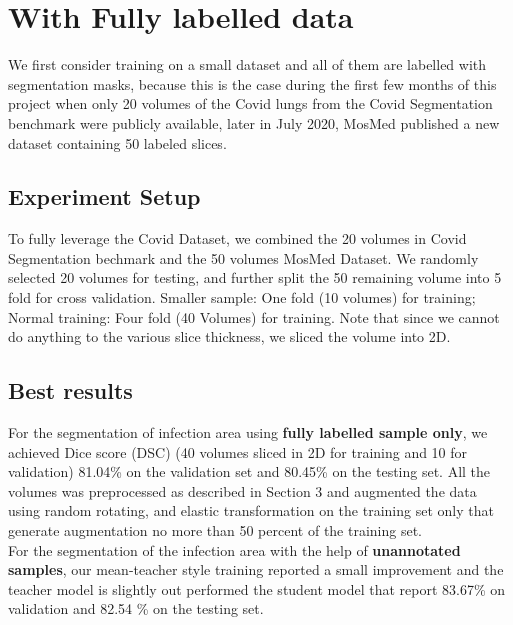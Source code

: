 \section{With Fully labelled data}
We first consider training on a small dataset and all of them are labelled with segmentation masks, because this is the case during the first few months of this project when only 20 volumes of the Covid lungs from the Covid Segmentation benchmark were publicly available, later in July 2020, MosMed published a new dataset containing 50 labeled slices.

\subsection{Experiment Setup}
To fully leverage the Covid Dataset, we combined the 20 volumes in Covid Segmentation bechmark and the 50 volumes MosMed Dataset. We randomly selected 20 volumes for testing, and further split the 50 remaining volume into 5 fold for cross validation. Smaller sample: One fold (10 volumes) for training; Normal training: Four fold (40 Volumes) for training.
Note that since we cannot do anything to the various slice thickness, we sliced the volume into 2D.

\subsection{Best results}
For the segmentation of infection area using \textbf{fully labelled sample only}, we achieved Dice score (DSC) (40 volumes sliced in 2D for training and 10 for validation) 81.04\% on the validation set and 80.45\% on the testing set. All the volumes was preprocessed as described in Section 3 and augmented the data using random rotating, and elastic transformation on the training set only that generate augmentation no more than 50 percent of the training set.\\

For the segmentation of the infection area with the help of \textbf{unannotated samples}, our mean-teacher style training reported a small improvement and the teacher model is slightly out performed the student model that report 83.67\% on validation and 82.54 \% on the testing set.


